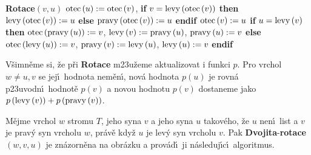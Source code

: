 {\bf Rotace$\left(v,u\right)$\newline} 
$\operatorname{otec}\left(u\right):=\operatorname{otec}\left(v\right)$,\newline 
{\bf if} $v=\operatorname{levy}\left(\operatorname{otec}\left(v\right)\right)$ {\bf then}\newline 
\phantom{---}$\operatorname{levy}\left(\operatorname{otec}\left(v\right)\right):=u$\newline 
{\bf else}\newline 
\phantom{---}$\operatorname{pravy}\left(\operatorname{otec}\left(v\right)\right):=u$\newline 
{\bf endif\newline 
$\operatorname{otec}\left(v\right):=u$\newline 
if} $u=\operatorname{levy}\left(v\right)$ {\bf then}\newline 
\phantom{---}$\operatorname{otec}\left(\operatorname{pravy}\left(u\right)\right):=v$, $\operatorname{levy}\left(v\right):=\operatorname{pravy}\left(u\right)$, $\operatorname{pravy}\left(u\right):=v$\newline 
{\bf else}\newline 
\phantom{---}$\operatorname{otec}\left(\operatorname{levy}\left(u\right)\right):=v$, $\operatorname{pravy}\left(v\right):=\operatorname{levy}\left(u\right)$, $\operatorname{levy}\left(u\right):=v$\newline 
{\bf endif}
\medskip

\flushpar V\v simn\v eme si, \v ze p\v ri {\bf Rotace} m\accent23u\v zeme 
aktualizovat i funkci $p$. Pro vrchol $w\ne u,v$ se jej\'\i\ hodnota 
nem\v en\'\i , nov\'a hodnota $p\left(u\right)$ je rovn\'a p\accent23uvodn\'\i\ hodnot\v e 
$p\left(v\right)$ a novou hodnotu $p\left(v\right)$ dostaneme jako 
$p\left(\operatorname{levy}\left(v\right)\right)+p\left(\operatorname{pravy}\left(v\right)\right)$.
\medskip

\flushpar M\v ejme vrchol $w$ stromu $T$, jeho syna $v$ a jeho 
syna $u$ takov\'eho, \v ze $u$ nen\'\i\ list a $v$ je prav\'y syn 
vrcholu $w$, pr\'av\v e kdy\v z $u$ je lev\'y syn vrcholu $v$. Pak 
{\bf Dvojita}-{\bf rotace$\left(w,v,u\right)$} je zn\'azorn\v ena na obr\'azku a prov\'ad\'\i\ 
ji n\'asleduj\'\i c\'\i\ algoritmus.

\midinsert
\centerline{}
\endcaption
\endinsert
\medskip

